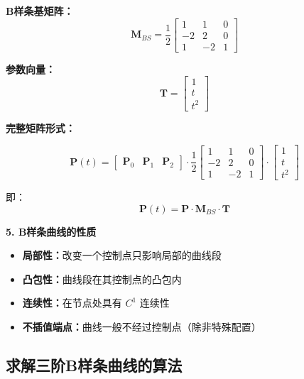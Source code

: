 \documentclass[12pt,a4paper]{article}
\begin{document}
\begin{tcolorbox}[breakable]
\textbf{B样条基矩阵：}
\begin{equation}
\mathbf{M}_{BS} = \frac{1}{2}\begin{bmatrix}
1 & 1 & 0 \\
-2 & 2 & 0 \\
1 & -2 & 1
\end{bmatrix}
\end{equation}

\textbf{参数向量：}
\begin{equation}
\mathbf{T} = \begin{bmatrix} 1 \\ t \\ t^2 \end{bmatrix}
\end{equation}

\textbf{完整矩阵形式：}

\begin{equation}
\mathbf{P}(t) = \begin{bmatrix} \mathbf{P}_0 & \mathbf{P}_1 & \mathbf{P}_2 \end{bmatrix} \cdot \frac{1}{2}\begin{bmatrix}
1 & 1 & 0 \\
-2 & 2 & 0 \\
1 & -2 & 1
\end{bmatrix} \cdot \begin{bmatrix} 1 \\ t \\ t^2 \end{bmatrix}
\end{equation}

即：
\begin{equation}
\mathbf{P}(t) = \mathbf{P} \cdot \mathbf{M}_{BS} \cdot \mathbf{T}
\end{equation}

\textbf{5. B样条曲线的性质}

\begin{itemize}
\item \textbf{局部性：}改变一个控制点只影响局部的曲线段
\item \textbf{凸包性：}曲线段在其控制点的凸包内
\item \textbf{连续性：}在节点处具有 $C^1$ 连续性
\item \textbf{不插值端点：}曲线一般不经过控制点（除非特殊配置）
\end{itemize}
\end{tcolorbox}

\subsection{求解三阶B样条曲线的算法}
\end{document}
